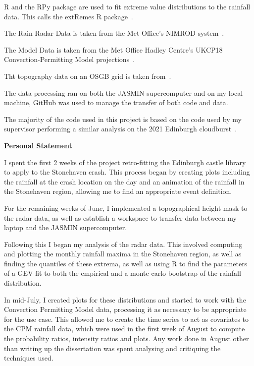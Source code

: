 \documentclass[12pt,a4paper]{report}
\begin{document}
R and the RPy package are used to fit extreme value distributions to the rainfall data.
This calls the extRemes R package~\cite{extremes_R}.

The Rain Radar Data is taken from the Met Office's NIMROD system~\cite{radar_data}.

The Model Data is taken from the Met Office Hadley Centre's UKCP18 Convection-Permitting Model projections~\cite{model_data}.

Tht topography data on an OSGB grid is taken from~\cite{radar_topog}.

The data processing ran on both the JASMIN supercomputer and on my local machine,
GitHub was used to manage the transfer of both code and data.

The majority of the code used in this project is based on the code used by my supervisor performing a similar analysis on the 2021 Edinburgh cloudburst~\cite{Tett_Soon}.


\newpage

\begin{center}
\textbf{Personal Statement} %
\end{center}

I spent the first 2 weeks of the project retro-fitting the Edinburgh castle
library to apply to the Stonehaven crash.
This process began by creating plots including the
rainfall at the crash location on the day and an animation of the rainfall
in the Stonehaven region, allowing me to find an appropriate event definition.

For the remaining weeks of June, I implemented a topographical height mask
to the radar data, as well as establish a workspace to transfer data between
my laptop and the JASMIN supercomputer.

Following this I began my analysis of the radar data.
This involved computing and plotting the monthly rainfall maxima in
the Stonehaven region, as well as finding the quantiles of these extrema,
as well as using R to find the parameters of a GEV fit to both the empirical
and a monte carlo bootstrap of the rainfall distribution.

In mid-July, I created plots for these distributions and started to work with the Convection Permitting Model data,
    processing it as necessary to be appropriate for the use case.
This allowed me to create the time series to act as covariates to the CPM rainfall data,
    which were used in the first week of August to compute the probability ratios, intensity ratios and plots.
Any work done in August other than writing up the dissertation was spent analysing and critiquing the techniques used.
\end{document}
